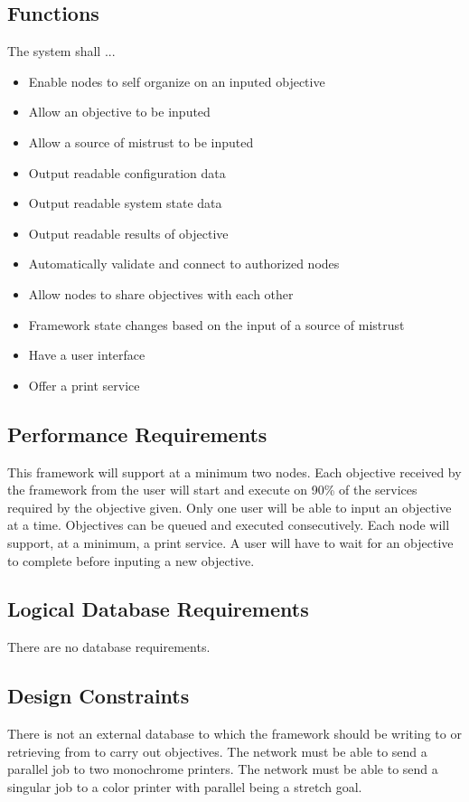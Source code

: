 \documentclass[draftclsnofoot, onecolumn, compsoc, 10pt]{IEEEtran}
\begin{document}
\subsection{Functions}
The system shall ...
\begin{itemize}
\item Enable nodes to self organize on an inputed objective
\item Allow an objective to be inputed
\item Allow a source of mistrust to be inputed
\item Output readable configuration data
\item Output readable system state data
\item Output readable results of objective
\item Automatically validate and connect to authorized nodes
\item Allow nodes to share objectives with each other
\item Framework state changes based on the input of a source of mistrust
\item Have a user interface
\item Offer a print service
\end{itemize}

\subsection{Performance Requirements}
This framework will support at a minimum two nodes. Each objective received by the framework from the user will start and execute on 90\% of the services required by the objective given. Only one user will be able to input an objective at a time. Objectives can be queued and executed consecutively. Each node will support, at a minimum, a print service. A user will have to wait for an objective to complete before inputing a new objective. 

\subsection{Logical Database Requirements}
There are no database requirements. 

\subsection{Design Constraints}
There is not an external database to which the framework should be writing to or retrieving from to carry out objectives. The network must be able to send a parallel job to two monochrome printers. The network must be able to send a singular job to a color printer with parallel being a stretch goal.
\end{document}
